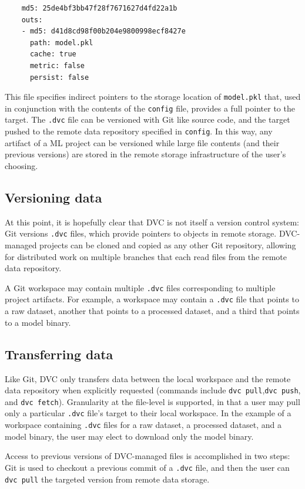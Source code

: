 \documentclass[10pt,sigconf, authordraft]{acmart}
\begin{document}
\begin{verbatim}
    md5: 25de4bf3bb47f28f7671627d4fd22a1b
    outs:
    - md5: d41d8cd98f00b204e9800998ecf8427e
      path: model.pkl
      cache: true
      metric: false
      persist: false
\end{verbatim}

This file specifies indirect pointers to the storage location of \verb|model.pkl| that, used in conjunction with the contents of the \verb|config| file, provides a full pointer to the target. The \verb|.dvc| file can be versioned with Git like source code, and the target pushed to the remote data repository specified in \verb|config|. In this way, any artifact of a ML project can be versioned while large file contents (and their previous versions) are stored in the remote storage infrastructure of the user's choosing. 

\subsection{Versioning data} \label{version}
At this point, it is hopefully clear that DVC is not itself a version control system: Git versions \verb|.dvc| files, which provide pointers to objects in remote storage. DVC-managed projects can be cloned and copied as any other Git repository, allowing for distributed work on multiple branches that each read files from the remote data repository. 

A Git workspace may contain multiple \verb|.dvc| files corresponding to multiple project artifacts. For example, a workspace may contain a \verb|.dvc| file that points to a raw dataset, another that points to a processed dataset, and a third that points to a model binary. 

\subsection{Transferring data} \label{transfer}
Like Git, DVC only transfers data between the local workspace and the remote data repository when explicitly requested (commands include \verb|dvc pull|,\verb|dvc push|, and \verb|dvc fetch|). Granularity at the file-level is supported, in that a user may pull only a particular \verb|.dvc| file's target to their local workspace. In the example of a workspace containing \verb|.dvc| files for a raw dataset, a processed dataset, and a model binary, the user may elect to download only the model binary.

Access to previous versions of DVC-managed files is accomplished in two steps: Git is used to checkout a previous commit of a \verb|.dvc| file, and then the user can \verb|dvc pull| the targeted version from remote data storage. 
\end{document}
